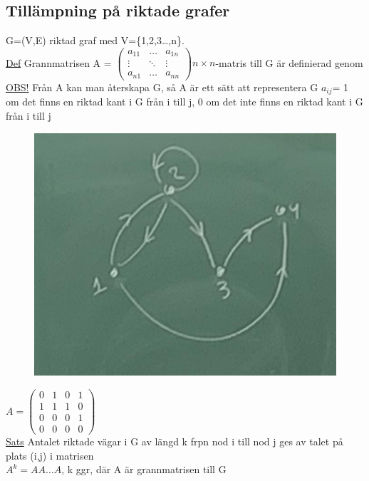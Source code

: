 \documentclass{article}
\begin{document}
        \subsection{Tillämpning på riktade grafer}
        G=(V,E) riktad graf med V=\{1,2,3\ldots,n\}.\\
        \underline{Def} Grannmatrisen A = 
        $\begin{pmatrix}
            a_{11} & \ldots & a_{1n}\\
            \vdots & \ddots & \vdots\\
            a_{n1} & \ldots & a_{nn}
        \end{pmatrix} n\times n$-matris till G är definierad genom\\
        \underline{OBS!} Från A kan man återskapa G, så A är ett sätt att representera G
        $a_{ij}$= 1 om det finns en riktad kant i G från i till j, 0 om det inte finns en riktad kant i G från i till j\\
        \begin{figure}[h]
            \includegraphics[scale=0.25]{imgs/lesson-21-11-23/img01-21-11-23.jpg}\\
        \end{figure}
        $A=\begin{pmatrix}
            0 & 1 & 0 & 1\\
            1 & 1 & 1 & 0\\
            0 & 0 & 0 & 1\\
            0 & 0 & 0 & 0
        \end{pmatrix}$\\
        \underline{Sats} Antalet riktade vägar i G av längd k frpn nod i till nod j ges av talet på plats (i,j) i matrisen\\
        $A^{k}=A A \ldots A$, k ggr, där A är grannmatrisen till G
    \clearpage
\end{document}
